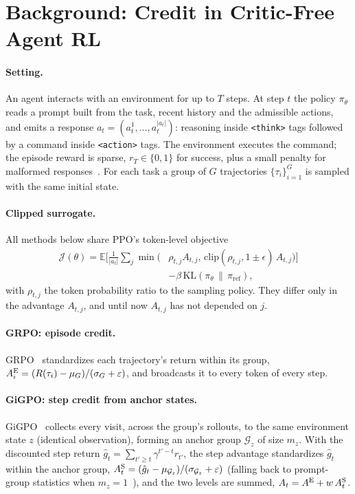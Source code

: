 \section{Background: Credit in Critic-Free Agent RL}
\label{sec:background}

\paragraph{Setting.}
An agent interacts with an environment for up to $T$ steps. At step $t$ the policy $\pi_\theta$ reads
a prompt built from the task, recent history and the admissible actions, and emits a response
$a_t = (a_t^1,\dots,a_t^{|a_t|})$: reasoning inside \texttt{<think>} tags followed by a command inside
\texttt{<action>} tags. The environment executes the command; the episode reward is sparse,
$r_T \in \{0, 1\}$ for success, plus a small penalty for malformed responses~\cite{feng2025gigpo}.
For each task a group of $G$ trajectories $\{\tau_i\}_{i=1}^{G}$ is sampled with the same initial state.

\paragraph{Clipped surrogate.}
All methods below share PPO's token-level objective~\cite{schulman2017ppo}
\begin{equation}
\begin{split}
\mathcal{J}(\theta) = \mathbb{E}\Big[\tfrac{1}{|a_t|}\textstyle\sum_{j}
  \min\big(&\rho_{t,j} A_{t,j},\, \mathrm{clip}(\rho_{t,j}, 1\!\pm\!\epsilon)\, A_{t,j}\big)\Big]\\
  &- \beta\, \mathrm{KL}(\pi_\theta \,\|\, \pi_{\mathrm{ref}}),
\end{split}
\label{eq:ppo}
\end{equation}
with $\rho_{t,j}$ the token probability ratio to the sampling policy. They differ only in the
advantage $A_{t,j}$, and until now $A_{t,j}$ has not depended on $j$.

\paragraph{GRPO: episode credit.}
GRPO~\cite{shao2024deepseekmath} standardizes each trajectory's return within its group,
$A^{\mathrm{E}}_i = (R(\tau_i) - \mu_G)/(\sigma_G + \varepsilon)$, and broadcasts it to every token of every step.

\paragraph{GiGPO: step credit from anchor states.}
GiGPO~\cite{feng2025gigpo} collects every visit, across the group's rollouts, to the same environment
state $z$ (identical observation), forming an anchor group $\mathcal{G}_z$ of size $m_z$. With the
discounted step return $\hat g_t = \sum_{t' \geq t} \gamma^{t'-t} r_{t'}$, the step advantage
standardizes $\hat g_t$ within the anchor group,
$A^{\mathrm{S}}_t = (\hat g_t - \mu_{\mathcal{G}_z})/(\sigma_{\mathcal{G}_z} + \varepsilon)$
(falling back to prompt-group statistics when $m_z = 1$~\cite{liang2026gaca}), and the two levels are
summed, $A_t = A^{\mathrm{E}} + w\,A^{\mathrm{S}}_t$.

